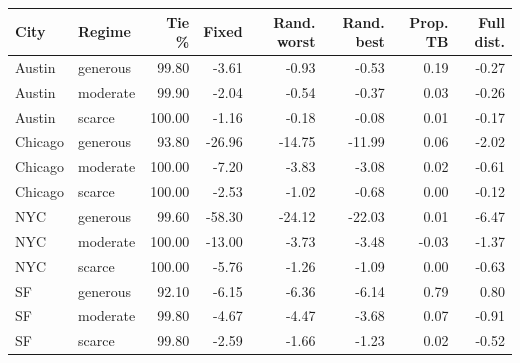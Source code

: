 \begin{tabular}{llrrrrrr}
\toprule
City & Regime & Tie \% & Fixed & Rand. worst & Rand. best & Prop. TB & Full dist. \\
\midrule
Austin & generous & 99.80 & -3.61 & -0.93 & -0.53 & 0.19 & -0.27 \\
Austin & moderate & 99.90 & -2.04 & -0.54 & -0.37 & 0.03 & -0.26 \\
Austin & scarce & 100.00 & -1.16 & -0.18 & -0.08 & 0.01 & -0.17 \\
Chicago & generous & 93.80 & -26.96 & -14.75 & -11.99 & 0.06 & -2.02 \\
Chicago & moderate & 100.00 & -7.20 & -3.83 & -3.08 & 0.02 & -0.61 \\
Chicago & scarce & 100.00 & -2.53 & -1.02 & -0.68 & 0.00 & -0.12 \\
NYC & generous & 99.60 & -58.30 & -24.12 & -22.03 & 0.01 & -6.47 \\
NYC & moderate & 100.00 & -13.00 & -3.73 & -3.48 & -0.03 & -1.37 \\
NYC & scarce & 100.00 & -5.76 & -1.26 & -1.09 & 0.00 & -0.63 \\
SF & generous & 92.10 & -6.15 & -6.36 & -6.14 & 0.79 & 0.80 \\
SF & moderate & 99.80 & -4.67 & -4.47 & -3.68 & 0.07 & -0.91 \\
SF & scarce & 99.80 & -2.59 & -1.66 & -1.23 & 0.02 & -0.52 \\
\bottomrule
\end{tabular}
